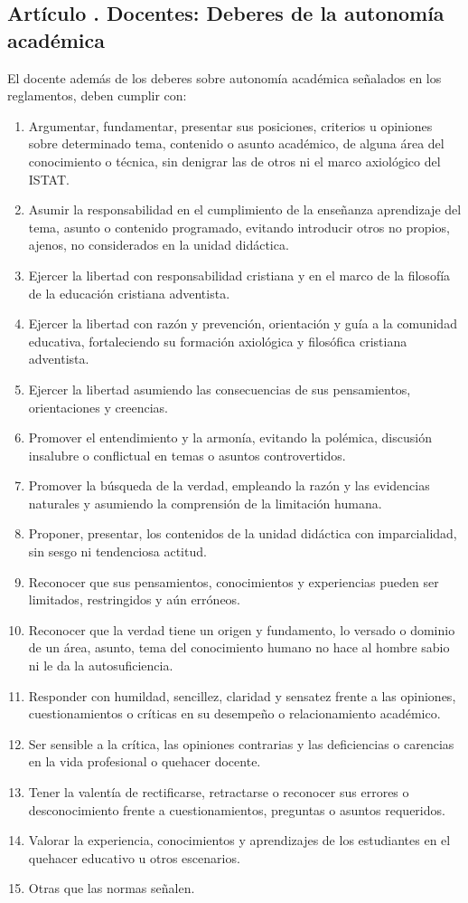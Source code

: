 \subsection{Artículo . Docentes: Deberes de la autonomía académica}
\addtocounter{ns}{1}
El docente además de los deberes sobre autonomía académica señalados en los reglamentos, deben cumplir con: 
\begin{enumerate}
\item Argumentar, fundamentar, presentar sus posiciones, criterios u opiniones sobre determinado tema, contenido o asunto académico, de alguna área del conocimiento o técnica, sin denigrar las de otros ni el marco axiológico del ISTAT. 
\item Asumir la responsabilidad en el cumplimiento de la enseñanza aprendizaje del tema, asunto o contenido programado, evitando introducir otros no propios, ajenos, no considerados en la unidad didáctica. 
\item Ejercer la libertad con responsabilidad cristiana y en el marco de la filosofía de la educación cristiana adventista. 
\item Ejercer la libertad con razón y prevención, orientación y guía a la comunidad educativa, fortaleciendo su formación axiológica y filosófica cristiana adventista. 
\item Ejercer la libertad asumiendo las consecuencias de sus pensamientos, orientaciones y creencias. 
\item Promover el entendimiento y la armonía, evitando la polémica, discusión insalubre o conflictual en temas o asuntos controvertidos. 
\item Promover la búsqueda de la verdad, empleando la razón y las evidencias naturales y asumiendo la comprensión de la limitación humana. 
\item Proponer, presentar, los contenidos de la unidad didáctica con imparcialidad, sin sesgo ni tendenciosa actitud. 
\item Reconocer que sus pensamientos, conocimientos y experiencias pueden ser limitados, restringidos y aún erróneos. 
\item Reconocer que la verdad tiene un origen y fundamento, lo versado o dominio de un área, asunto, tema del conocimiento humano no hace al hombre sabio ni le da la autosuficiencia. 
\item Responder con humildad, sencillez, claridad y sensatez frente a las opiniones, cuestionamientos o críticas en su desempeño o relacionamiento académico. 
\item Ser sensible a la crítica, las opiniones contrarias y las deficiencias o carencias en la vida profesional o quehacer docente. 
\item Tener la valentía de rectificarse, retractarse o reconocer sus errores o desconocimiento frente a cuestionamientos, preguntas o asuntos requeridos. 
\item Valorar la experiencia, conocimientos y aprendizajes de los estudiantes en el quehacer educativo u otros escenarios. 
\item Otras que las normas señalen.   
\end{enumerate}
